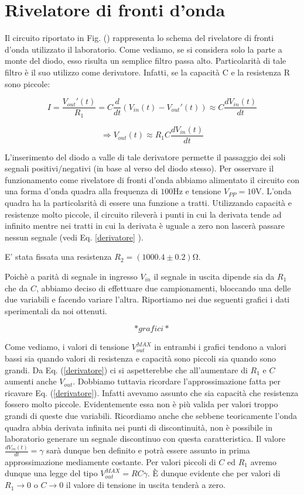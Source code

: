 \section{Rivelatore di fronti d'onda}

Il circuito riportato in Fig. () rappresenta lo schema del rivelatore di fronti d'onda utilizzato il laboratorio. Come vediamo, se si considera solo la parte a monte del diodo, esso risulta un semplice filtro passa alto. Particolarità di tale filtro è il suo utilizzo come derivatore. Infatti, se la capacità C e la resistenza R sono piccole:


$$ I=\frac{V_{out}'(t)}{R_1}=C\frac{d}{dt}(V_{in}(t)-V_{out}'(t)) \approx C \frac{dV_{in}(t)}{dt} $$

\begin{equation} 
\Rightarrow V_{out}(t) \approx R_1C \frac{dV_{in}(t)}{dt} 
\label{derivatore}
\end{equation}

L'inserimento del diodo a valle di tale derivatore permette il passaggio dei soli segnali positivi/negativi (in base al verso del diodo stesso). Per osservare il funzionamento come rivelatore di fronti d'onda abbiamo alimentato il circuito con una forma d'onda quadra alla frequenza di $100 \si{\hertz}$ e tensione $V_{PP}=10 \si{\volt}$. L'onda quadra ha la particolarità di essere una funzione a tratti. Utilizzando capacità e resistenze molto piccole, il circuito rileverà i punti in cui la derivata tende ad infinito mentre nei tratti in cui la derivata è uguale a zero non lascerà passare nessun segnale (vedi Eq. \ref{derivatore} ).

E' stata fissata una resistenza $R_2=(1000.4 \pm 0.2) \si{\ohm}$. 

Poichè a parità di segnale in ingresso $V_{in}$ il segnale in uscita dipende sia da $R_1$ che da $C$, abbiamo deciso di effettuare due campionamenti, bloccando una delle due variabili e facendo variare l'altra. Riportiamo nei due seguenti grafici i dati sperimentali da noi ottenuti.


$$*grafici*$$


Come vediamo, i valori di tensione $V_{out}^{MAX}$ in entrambi i grafici tendono a valori bassi sia quando valori di resistenza e capacità sono piccoli sia quando sono grandi. Da Eq. (\ref{derivatore}) ci si aspetterebbe che all'aumentare di $R_1$ e $C$ aumenti anche $V_{out}$. Dobbiamo tuttavia ricordare l'approssimazione fatta per ricavare Eq. (\ref{derivatore}). Infatti avevamo assunto che sia capacità che resistenza fossero molto piccole. Evidentemente essa non è più valida per valori troppo grandi di queste due variabili. Ricordiamo anche che sebbene teoricamente l'onda quadra abbia derivata infinita nei punti di discontinuità, non è possibile in laboratorio generare un segnale discontinuo con questa caratteristica. Il valore $\frac{dV_{in}(t)}{dt}=\gamma$  sarà dunque ben definito e potrà essere assunto in prima approssimazione mediamente costante. Per valori piccoli di $C$ ed $R_1$ avremo dunque una legge del tipo $V_{out}^{MAX}= RC \gamma$. \`E dunque evidente che per valori di $R_1\rightarrow 0$ o $C\rightarrow 0$ il valore di tensione in uscita tenderà a zero.


